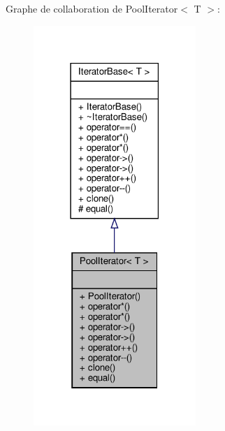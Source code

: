 Graphe de collaboration de Pool\+Iterator$<$ T $>$\+:\nopagebreak
\begin{figure}[H]
\begin{center}
\leavevmode
\includegraphics[width=174pt]{class_pool_iterator__coll__graph}
\end{center}
\end{figure}
